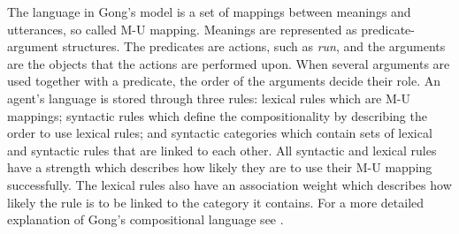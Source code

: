 The language in Gong's model is a set of mappings between meanings and utterances, so called M-U mapping. Meanings are represented as predicate-argument structures. The predicates are actions, such as \textit{run}, and the arguments are the objects that the actions are performed upon. When several arguments are used together with a predicate, the order of the arguments decide their role. An agent's language is stored through three rules: lexical rules which are M-U mappings; syntactic rules which define the compositionality by describing the order to use lexical rules; and syntactic categories which contain sets of lexical and syntactic rules that are linked to each other. All syntactic and lexical rules have a strength which describes how likely they are to use their M-U mapping successfully. The lexical rules also have an association weight which describes how likely the rule is to be linked to the category it contains. For a more detailed explanation of Gong's compositional language see \citep[section 3.2]{gong2011simulating}.
